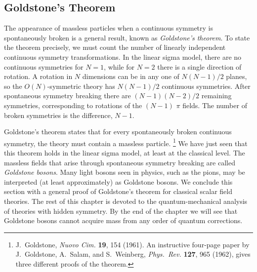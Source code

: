 \subsection{Goldstone's Theorem}

The appearance of massless particles when a continuous symmetry is
spontaneously broken is a general result, known as \emph{Goldstone's theorem}.
To state the theorem precisely, we must count the number of linearly
independent continuous symmetry transformations.  In the linear sigma model,
there are no continuous symmetries for $N = 1$, while for $N = 2$ there is a
single direction of rotation.  A rotation in $N$ dimensions can be in any one
of $N(N-1)/2$ planes, so the $O(N)$-symmetric theory has $N(N-1)/2$
continuous symmetries.  After spontaneous symmetry breaking there are
$(N-1)(N-2)/2$ remaining symmetries, corresponding to rotations of the
$(N-1)$ $\pi$ fields.  The number of broken symmetries is the difference,
$N-1$.

Goldstone's theorem states that for every spontaneously broken continuous
symmetry, the theory must contain a massless particle.%
\footnote{J.~Goldstone, \emph{Nuovo Cim.} \textbf{19}, 154 (1961).  An
instructive four-page paper by J.~Goldstone, A.~Salam, and S.~Weinberg,
\emph{Phys.\ Rev.} \textbf{127}, 965 (1962), gives three different proofs of
the theorem.}  We have just seen that this theorem holds in the linear sigma
model, at least at the classical level.  The massless fields that arise through
spontaneous symmetry breaking are called \emph{Goldstone bosons}.  Many light
bosons seen in physics, such as the pions, may be interpreted (at least
approximately) as Goldstone bosons.  We conclude this section with a general
proof of Goldstone's theorem for classical scalar field theories.  The rest of
this chapter is devoted to the quantum-mechanical analysis of theories with
hidden symmetry.  By the end of the chapter we will see that Goldstone bosons
cannot acquire mass from any order of quantum corrections.

